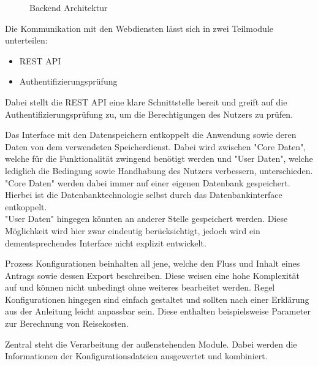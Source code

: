 \begin{figure}[h]
    
    \caption{Backend Architektur}\label{fig:BackendArch}
\end{figure}

Die Kommunikation mit den Webdiensten lässt sich in zwei Teilmodule unterteilen:
\begin{itemize}
    \item \ac{REST} \ac{API}
    \item Authentifizierungsprüfung
\end{itemize}
Dabei stellt die \ac{REST} \ac{API} eine klare Schnittstelle bereit und greift auf die Authentifizierungsprüfung zu,
um die Berechtigungen des Nutzers zu prüfen.

Das Interface mit den Datenspeichern entkoppelt die Anwendung sowie deren Daten von dem verwendeten Speicherdienst.
Dabei wird zwischen "Core Daten", welche für die Funktionalität zwingend benötigt werden
und "User Daten", welche lediglich die Bedingung sowie Handhabung des Nutzers verbessern, unterschieden.\\
"Core Daten" werden dabei immer auf einer eigenen Datenbank gespeichert.
Hierbei ist die Datenbanktechnologie selbst durch das Datenbankinterface entkoppelt.\\
"User Daten" hingegen könnten an anderer Stelle gespeichert werden.
Diese Möglichkeit wird hier zwar eindeutig berücksichtigt, jedoch wird ein dementsprechendes Interface nicht explizit entwickelt.

Prozess Konfigurationen beinhalten all jene, welche den Fluss und Inhalt eines Antrags sowie dessen Export beschreiben.
Diese weisen eine hohe Komplexität auf und können nicht unbedingt ohne weiteres bearbeitet werden.
Regel Konfigurationen hingegen sind einfach gestaltet und sollten nach einer Erklärung aus der Anleitung leicht anpassbar sein.
Diese enthalten beispielsweise Parameter zur Berechnung von Reisekosten.

Zentral steht die Verarbeitung der außenstehenden Module.
Dabei werden die Informationen der Konfigurationsdateien ausgewertet und kombiniert.
